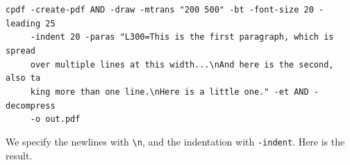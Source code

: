 \documentclass{book}
\begin{document}
\begin{framed}
 \noindent\small\verb?cpdf -create-pdf AND -draw -mtrans "200 500" -bt -font-size 20 -leading 25?\\
 \noindent\small\verb?     -indent 20 -paras "L300=This is the first paragraph, which is spread ?\\
 \noindent\small\verb?     over multiple lines at this width...\nAnd here is the second, also ta?\\
 \noindent\small\verb?     king more than one line.\nHere is a little one." -et AND -decompress?\\
 \noindent\small\verb?     -o out.pdf?
\end{framed}

\noindent We specify the newlines with \texttt{\textbackslash n}, and the indentation with \texttt{-indent}. Here is the result.

\noindent
\end{document}
